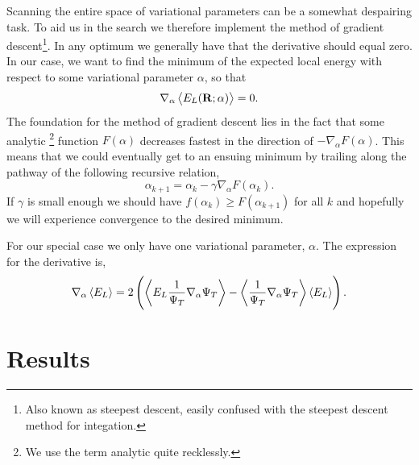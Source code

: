 \documentclass[
    a4paper, aps, twocolumn, floatfix, superscriptaddress, nofootinbib]{revtex4-1}
\newcommand{\1}{\mathds{1}}
\begin{document}
            Scanning the entire space of variational parameters can be a
            somewhat despairing task. To aid us in the search we therefore
            implement the method of gradient descent\footnote{Also known as
            steepest descent, easily confused with the steepest descent method
            for integation.}. In any optimum we generally have that the
            derivative should equal zero. In our case, we want to find the
            minimum of the expected local energy with respect to some
            variational parameter $\alpha$, so that
            \begin{equation}
                \nabla_\alpha \expval{E_L(\mathbf{R}; \alpha)} = 0.
            \end{equation}
            The foundation for  the method of gradient descent lies in the fact
            that some analytic \footnote{We use the term analytic quite
            recklessly.} function $F(\alpha)$ decreases fastest in the direction
            of $-\nabla_\alpha F(\alpha)$. This means that we could eventually
            get to an ensuing minimum by trailing along the pathway of the
            following recursive relation,
            \begin{equation}
                \alpha_{k+1} = \alpha_k - \gamma \nabla_{\alpha} F(\alpha_k).
            \end{equation}
            If $\gamma$ is small enough we should have $f(\alpha_k) \geq
            F(\alpha_{k+1})$ for all $k$ and hopefully we will experience
            convergence to the desired minimum.

            For our special case we only have one variational parameter,
            $\alpha$.  The expression for the derivative is,
            \begin{equation}
                \nabla_{\alpha}\expval{E_L}
                =
                2\left(
                    \expval{E_L\frac{1}{\Psi_T}\nabla_{\alpha}\Psi_T}
                    - \expval{\frac{1}{\Psi_T} \nabla_{\alpha}\Psi_T}\expval{E_L}
                \right).
                \label{eq:variational_parameter_gradient}
            \end{equation}


\section{Results}
\end{document}
